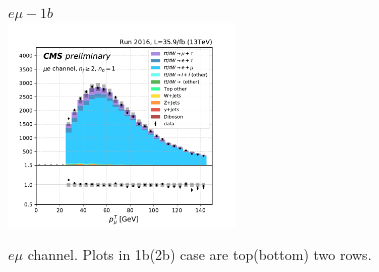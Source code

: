 

\begin{figure}[h]
    \centering
    $e\mu - 1b$ \\
    \includegraphics[width=6cm]{appendices/kinematicsPlots/figures/kinematics_pickles/emu/1b/emu_1b_lepton1_pt.pdf}

    
    \caption{ $e\mu$ channel. Plots in 1b(2b) case are top(bottom) two rows.}
    \label{app}
\end{figure}

